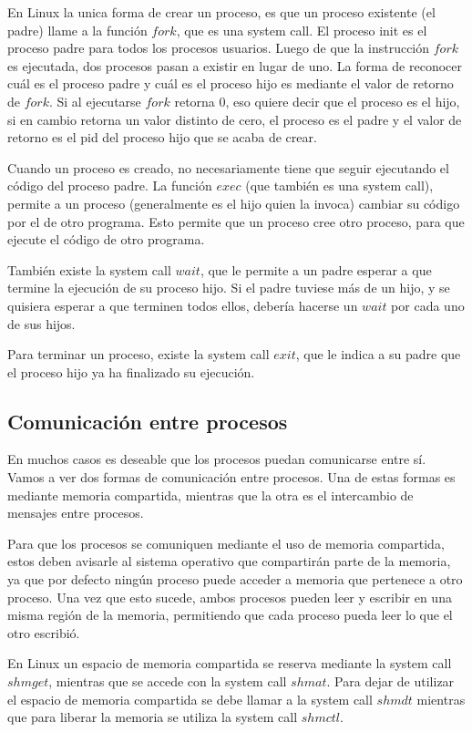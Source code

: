 \documentclass{article}
\begin{document}
En Linux la unica forma de crear un proceso, es que un proceso existente (el padre) llame a la funci\'on $fork$, que es una system call. El proceso init es el proceso padre para todos los procesos usuarios. Luego de que la instrucci\'on $fork$ es ejecutada, dos procesos pasan a existir en lugar de uno. La forma de reconocer cu\'al es el proceso padre y cu\'al es el proceso hijo es mediante el valor de retorno de $fork$. Si al ejecutarse $fork$ retorna 0, eso quiere decir que el proceso es el hijo, si en cambio retorna un valor distinto de cero, el proceso es el padre y el valor de retorno es el pid del proceso hijo que se acaba de crear.

Cuando un proceso es creado, no necesariamente tiene que seguir ejecutando el c\'odigo del proceso padre. La funci\'on $exec$ (que tambi\'en es una system call), permite a un proceso (generalmente es el hijo quien la invoca) cambiar su c\'odigo por el de otro programa. Esto permite que un proceso cree otro proceso, para que ejecute el c\'odigo de otro programa.

Tambi\'en existe la system call $wait$, que le permite a un padre esperar a que termine la ejecuci\'on de su proceso hijo. Si el padre tuviese m\'as de un hijo, y se quisiera esperar a que terminen todos ellos, deber\'ia hacerse un $wait$ por cada uno de sus hijos.

Para terminar un proceso, existe la system call $exit$, que le indica a su padre que el proceso hijo ya ha finalizado su ejecuci\'on.

\subsection{Comunicaci\'on entre procesos}

En muchos casos es deseable que los procesos puedan comunicarse entre s\'i. Vamos a ver dos formas de comunicaci\'on entre procesos. Una de estas formas es mediante memoria compartida, mientras que la otra es el intercambio de mensajes entre procesos.

Para que los procesos se comuniquen mediante el uso de memoria compartida, estos deben avisarle al sistema operativo que compartir\'an parte de la memoria, ya que por defecto ning\'un proceso puede acceder a memoria que pertenece a otro proceso. Una vez que esto sucede, ambos procesos pueden leer y escribir en una misma regi\'on de la memoria, permitiendo que cada proceso pueda leer lo que el otro escribi\'o.

En Linux un espacio de memoria compartida se reserva mediante la system call $shmget$, mientras que se accede con la system call $shmat$. Para dejar de utilizar el espacio de memoria compartida se debe llamar a la system call $shmdt$ mientras que para liberar la memoria se utiliza la system call $shmctl$.
\end{document}

